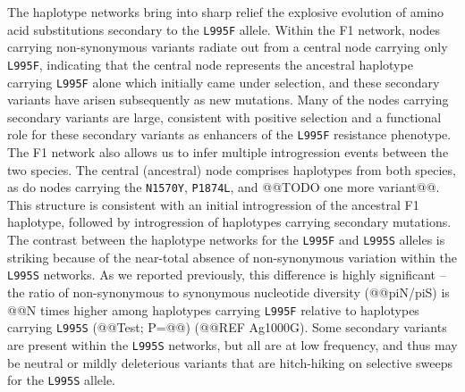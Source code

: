 \documentclass[a4paper,11pt,abstracton]{scrartcl}
\begin{document}
%
The haplotype networks bring into sharp relief the explosive evolution of amino acid substitutions secondary to the \texttt{L995F} allele.
%
Within the F1 network, nodes carrying non-synonymous variants radiate out from a central node carrying only \texttt{L995F}, indicating that the central node represents the ancestral haplotype carrying \texttt{L995F} alone which initially came under selection, and these secondary variants have arisen subsequently as new mutations.
%
Many of the nodes carrying secondary variants are large, consistent with positive selection and a functional role for these secondary variants as enhancers of the \texttt{L995F} resistance phenotype.
%
The F1 network also allows us to infer multiple introgression events between the two species.
%
The central (ancestral) node comprises haplotypes from both species, as do nodes carrying the \texttt{N1570Y}, \texttt{P1874L}, and @@TODO one more variant@@.
%
This structure is consistent with an initial introgression of the ancestral F1 haplotype, followed by introgression of haplotypes carrying secondary mutations.
%
The contrast between the haplotype networks for the \texttt{L995F} and \texttt{L995S} alleles is striking because of the near-total absence of non-synonymous variation within the \texttt{L995S} networks.
%
As we reported previously, this difference is highly significant -- the ratio of non-synonymous to synonymous nucleotide diversity (@@piN/piS) is @@N times higher among haplotypes carrying \texttt{L995F} relative to haplotypes carrying \texttt{L995S} (@@Test; P=@@) (@@REF Ag1000G).
%
Some secondary variants are present within the \texttt{L995S} networks, but all are at low frequency, and thus may be neutral or mildly deleterious variants that are hitch-hiking on selective sweeps for the \texttt{L995S} allele.
\end{document}
